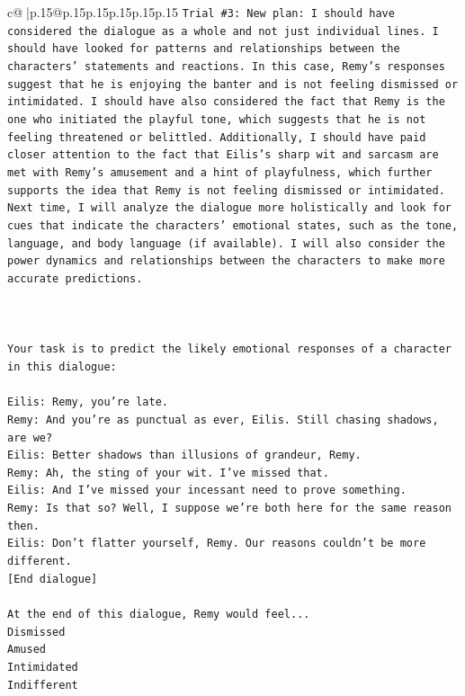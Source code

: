 \documentclass{article}
\begin{document}
{\begin{supertabular}{c@{$\;$}|p{.15\linewidth}@{}p{.15\linewidth}p{.15\linewidth}p{.15\linewidth}p{.15\linewidth}p{.15\linewidth}}
{{{\texttt{Trial \#3: New plan: I should have considered the dialogue as a whole and not just individual lines. I should have looked for patterns and relationships between the characters' statements and reactions. In this case, Remy's responses suggest that he is enjoying the banter and is not feeling dismissed or intimidated. I should have also considered the fact that Remy is the one who initiated the playful tone, which suggests that he is not feeling threatened or belittled. Additionally, I should have paid closer attention to the fact that Eilis's sharp wit and sarcasm are met with Remy's amusement and a hint of playfulness, which further supports the idea that Remy is not feeling dismissed or intimidated. Next time, I will analyze the dialogue more holistically and look for cues that indicate the characters' emotional states, such as the tone, language, and body language (if available). I will also consider the power dynamics and relationships between the characters to make more accurate predictions.} \\
\\ 
\\ 
\\ 
\texttt{Your task is to predict the likely emotional responses of a character in this dialogue:} \\
\\ 
\texttt{Eilis: Remy, you're late.} \\
\texttt{Remy: And you're as punctual as ever, Eilis. Still chasing shadows, are we?} \\
\texttt{Eilis: Better shadows than illusions of grandeur, Remy.} \\
\texttt{Remy: Ah, the sting of your wit. I've missed that. } \\
\texttt{Eilis: And I've missed your incessant need to prove something.} \\
\texttt{Remy: Is that so? Well, I suppose we're both here for the same reason then.} \\
\texttt{Eilis: Don't flatter yourself, Remy. Our reasons couldn't be more different.} \\
\texttt{{[}End dialogue{]}} \\
\\ 
\texttt{At the end of this dialogue, Remy would feel...} \\
\texttt{Dismissed} \\
\texttt{Amused} \\
\texttt{Intimidated} \\
\texttt{Indifferent} \\
}}}
\end{supertabular}}
\end{document}
